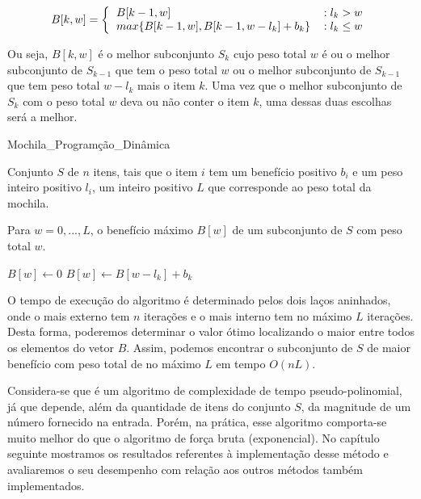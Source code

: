 \[ B[k,w]= \left \{ \begin{tabular}  {lc}
                                     $B[k-1,w]$ & $:l_k > w$ \\
                                     $max\{ B[k-1,w], B[k-1,w-l_k]+b_k\}$ & $:l_k \leq w$ \\
                                  \end{tabular} \right. \]


Ou seja, $B[k,w]$ é o melhor subconjunto $S_k$ cujo peso total $w$ é ou o melhor subconjunto de $S_{k-1}$ que tem o peso total $w$ ou o melhor
subconjunto de $S_{k-1}$ que tem peso total $w-l_k$ mais o item $k$. Uma vez que o melhor subconjunto de $S_k$ com o peso total $w$ deva ou não conter o item $k$, uma dessas duas escolhas será a melhor.

\begin{algorithm}
\caption{Mochila\_Programção\_Dinâmica} %
\label{alg2}
\begin{algorithmic}[1]
 
	\REQUIRE Conjunto $S$ de $n$ itens, tais que o item $i$ tem um benefício positivo $b_i$ e um peso inteiro positivo $l_i$, um inteiro positivo $L$ que corresponde ao peso total da mochila.
 
	\ENSURE Para $w=0,...,L$, o benefício máximo $B[w]$ de um subconjunto de $S$ com peso total $w$.

		\STATE $B[w] \leftarrow 0$
	\ENDFOR
				\STATE $B[w] \leftarrow B[w-l_k]+b_k$
			\ENDIF
		\ENDFOR
	\ENDFOR
\end{algorithmic}
\end{algorithm}

O tempo de execução do algoritmo é determinado pelos dois laços aninhados, onde o mais externo tem $n$ iterações e o mais interno tem no máximo $L$ iterações. Desta forma, poderemos determinar o valor ótimo localizando o maior entre todos os elementos do vetor $B$. Assim, podemos encontrar o subconjunto de $S$ de maior benefício com peso total de no máximo $L$ em tempo $O(nL)$. 

Considera-se que é um algoritmo de complexidade de tempo pseudo-polinomial, já que depende, além da quantidade de itens do conjunto $S$, da magnitude de um número fornecido na entrada. Porém, na prática, esse algoritmo comporta-se muito melhor do que o algoritmo de força bruta (exponencial). No capítulo seguinte mostramos os resultados referentes à implementação desse método e avaliaremos o seu desempenho com relação aos outros métodos também implementados.


